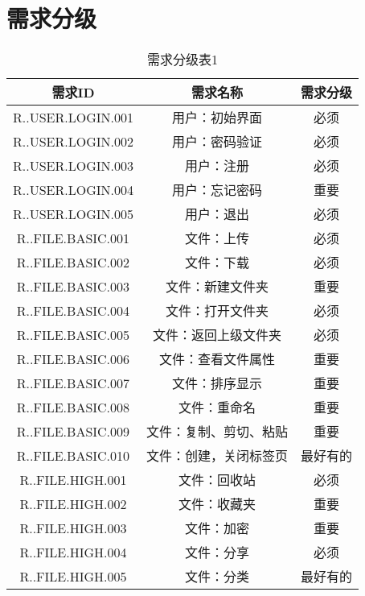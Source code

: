 \chapter{需求分级}
\begin{table}[htbp]
\centering
\caption{需求分级表1} \label{tab:abbr}
\begin{tabular}{|c|c|c|}
    \hline
    需求ID & 需求名称 & 需求分级 \\
    \hline
    R..USER.LOGIN.001 & 用户：初始界面 & 必须 \\
    \hline
    R..USER.LOGIN.002 & 用户：密码验证 & 必须 \\
    \hline 
    R..USER.LOGIN.003 & 用户：注册 & 必须 \\
    \hline
    R..USER.LOGIN.004 & 用户：忘记密码 & 重要 \\
    \hline
    R..USER.LOGIN.005 & 用户：退出 & 必须 \\
    \hline
    R..FILE.BASIC.001 & 文件：上传 & 必须 \\
    \hline
    R..FILE.BASIC.002 & 文件：下载 & 必须 \\
    \hline
    R..FILE.BASIC.003 & 文件：新建文件夹 & 重要 \\
    \hline
    R..FILE.BASIC.004 & 文件：打开文件夹 & 必须 \\
    \hline
    R..FILE.BASIC.005 & 文件：返回上级文件夹 & 必须 \\
    \hline
    R..FILE.BASIC.006 & 文件：查看文件属性 & 重要 \\
    \hline
    R..FILE.BASIC.007 & 文件：排序显示 & 重要 \\
    \hline
    R..FILE.BASIC.008 & 文件：重命名 & 重要 \\
    \hline
    R..FILE.BASIC.009 & 文件：复制、剪切、粘贴 & 重要 \\
    \hline
    R..FILE.BASIC.010 & 文件：创建，关闭标签页 & 最好有的 \\
    \hline
    R..FILE.HIGH.001 & 文件：回收站 & 必须 \\
    \hline
    R..FILE.HIGH.002 & 文件：收藏夹 & 重要 \\
    \hline
    R..FILE.HIGH.003 & 文件：加密 & 重要 \\
    \hline
    R..FILE.HIGH.004 & 文件：分享 & 必须 \\
    \hline
    R..FILE.HIGH.005 & 文件：分类 & 最好有的 \\
    \hline 
\end{tabular}
\end{table}
